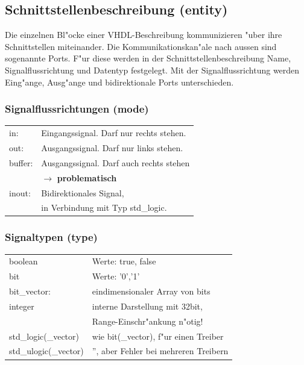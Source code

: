 \subsection{Schnittstellenbeschreibung (entity)}
	Die einzelnen Bl"ocke einer VHDL-Beschreibung kommunizieren "uber ihre 
	Schnittstellen miteinander. Die Kommunikationskan"ale nach aussen sind sogenannte Ports. F"ur diese werden in der Schnittstellenbeschreibung Name, Signalflussrichtung und Datentyp festgelegt. Mit der Signalflussrichtung werden Eing"ange, Ausg"ange und bidirektionale Ports unterschieden.
	\vspace{-\baselineskip}
	\begin{multicols}{2}
		
		
	\end{multicols}
\begin{multicols}{2}
\subsubsection{Signalflussrichtungen (mode)}
	\begin{tabular}{ll}
		in: & Eingangssignal. Darf nur rechts stehen.\\
		out: & Ausgangssignal. Darf nur links stehen.\\
		buffer: & Ausgangssignal. Darf auch rechts stehen\\
		&  $\rightarrow$ \textbf{problematisch}\\
		inout: & Bidirektionales Signal, \\
		& in Verbindung mit Typ std\_logic.\\
	\end{tabular}
\vfill\null
\subsubsection{Signaltypen (type)}
	\begin{tabular}{ll}
		boolean & Werte: true, false\\
		bit & Werte: '0','1'\\
		bit\_vector: & eindimensionaler Array von bits\\
		integer & interne Darstellung mit 32bit,\\
		& Range-Einschr"ankung n"otig!\\
		std\_logic(\_vector) & wie bit(\_vector), f"ur einen Treiber\\
		std\_ulogic(\_vector) & '', aber Fehler bei mehreren Treibern\\
	\end{tabular}
\end{multicols}
	
